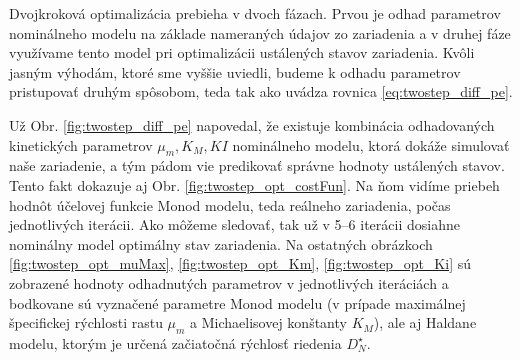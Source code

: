 Dvojkroková optimalizácia prebieha v dvoch fázach. Prvou je odhad parametrov nominálneho modelu na základe nameraných údajov zo zariadenia a v druhej fáze využívame tento model pri optimalizácii ustálených stavov zariadenia. Kvôli jasným výhodám, ktoré sme vyššie uviedli, budeme k odhadu parametrov pristupovať druhým spôsobom, teda tak ako uvádza rovnica \eqref{eq:twostep_diff_pe}.

Už Obr. \ref{fig:twostep_diff_pe} napovedal, že existuje kombinácia odhadovaných kinetických parametrov $ \mu_{m}, K_{M}, K{I} $ nominálneho modelu, ktorá dokáže simulovať naše zariadenie, a tým pádom vie predikovať správne hodnoty ustálených stavov. Tento fakt dokazuje aj Obr. \ref{fig:twostep_opt_costFun}. Na ňom vidíme priebeh hodnôt účelovej funkcie Monod modelu, teda reálneho zariadenia, počas jednotlivých iterácii. Ako môžeme sledovať, tak už v 5--6 iterácii dosiahne nominálny model optimálny stav zariadenia. Na ostatných obrázkoch \ref{fig:twostep_opt_muMax}, \ref{fig:twostep_opt_Km}, \ref{fig:twostep_opt_Ki} sú zobrazené hodnoty odhadnutých parametrov v jednotlivých iteráciách a bodkovane sú vyznačené parametre Monod modelu (v prípade maximálnej špecifickej rýchlosti rastu $ \mu_{m} $ a Michaelisovej konštanty $ K_{M} $), ale aj Haldane modelu, ktorým je určená začiatočná rýchlosť riedenia $ D_{N}^{\star} $. 

